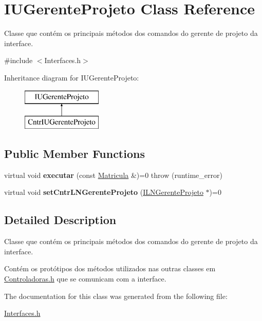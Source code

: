 \hypertarget{class_i_u_gerente_projeto}{}\section{I\+U\+Gerente\+Projeto Class Reference}
\label{class_i_u_gerente_projeto}


Classe que contém os principais métodos dos comandos do gerente de projeto da interface.  




{\ttfamily \#include $<$Interfaces.\+h$>$}

Inheritance diagram for I\+U\+Gerente\+Projeto\+:\begin{figure}[H]
\begin{center}
\leavevmode
\includegraphics[height=2.000000cm]{class_i_u_gerente_projeto}
\end{center}
\end{figure}
\subsection*{Public Member Functions}
\begin{DoxyCompactItemize}
\item 
\hypertarget{class_i_u_gerente_projeto_a71b17efb4677cb13424e062948161626}{}\label{class_i_u_gerente_projeto_a71b17efb4677cb13424e062948161626} 
virtual void {\bfseries executar} (const \hyperlink{class_matricula}{Matricula} \&)=0  throw (runtime\+\_\+error)
\item 
\hypertarget{class_i_u_gerente_projeto_a056626862d1de6b472a163dc9350004e}{}\label{class_i_u_gerente_projeto_a056626862d1de6b472a163dc9350004e} 
virtual void {\bfseries set\+Cntr\+L\+N\+Gerente\+Projeto} (\hyperlink{class_i_l_n_gerente_projeto}{I\+L\+N\+Gerente\+Projeto} $\ast$)=0
\end{DoxyCompactItemize}


\subsection{Detailed Description}
Classe que contém os principais métodos dos comandos do gerente de projeto da interface. 

Contém os protótipos dos métodos utilizados nas outras classes em \hyperlink{_controladoras_8h}{Controladoras.\+h} que se comunicam com a interface. 

The documentation for this class was generated from the following file\+:\begin{DoxyCompactItemize}
\item 
\hyperlink{_interfaces_8h}{Interfaces.\+h}\end{DoxyCompactItemize}
